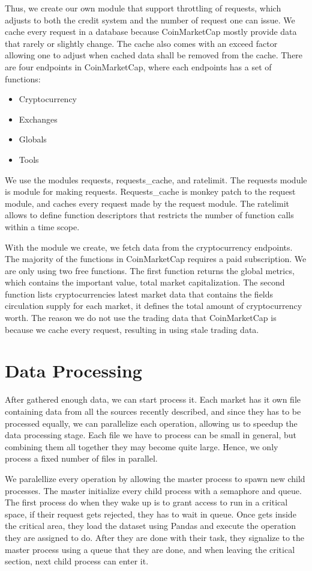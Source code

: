 Thus, we create our own module that support throttling of requests, which adjusts to both the credit system and the number of request one can issue. We cache every request in a database because CoinMarketCap mostly provide data that rarely or slightly change. The cache also comes with an exceed factor allowing one to adjust when cached data shall be removed from the cache. There are four endpoints in CoinMarketCap, where each endpoints has a set of functions:
\begin{itemize}
    \item Cryptocurrency
    \item Exchanges
    \item Globals
    \item Tools
\end{itemize}

We use the modules requests, requests\_cache, and ratelimit. The requests module is module for making requests. Requests\_cache is monkey patch to the request module, and caches every request made by the request module. The ratelimit allows to define function descriptors that restricts the number of function calls within a time scope.

With the module we create, we fetch data from the cryptocurrency endpoints. The majority of the functions in CoinMarketCap requires a paid subscription. We are only using two free functions. The first function returns the global metrics, which contains the important value, total market capitalization. The second function lists cryptocurrencies latest market data that contains the fields circulation supply for each market, it defines the total amount of cryptocurrency worth. The reason we do not use the trading data that CoinMarketCap is because we cache every request, resulting in using stale trading data.

\section{Data Processing}
After gathered enough data, we can start process it. Each market has it own file containing data from all the sources recently described, and since they has to be processed equally, we can parallelize each operation, allowing us to speedup the data processing stage. Each file we have to process can be small in general, but combining them all together they may become quite large. Hence, we only process a fixed number of files in parallel. 

We paralellize every operation by allowing the master process to spawn new child processes. The master initialize every child process with a semaphore and queue. The first process do when they wake up is to grant access to run in a critical space, if their request gets rejected, they has to wait in queue. Once gets inside the critical area, they load the dataset using Pandas and execute the operation they are assigned to do. After they are done with their task, they signalize to the master process using a queue that they are done, and when leaving the critical section, next child process can enter it.

